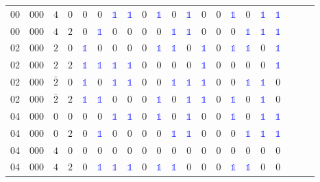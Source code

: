 \begin{longtable*}{c| cccccccccccccccccccc }
00& 000& $4$& $0$& 0& 0& \textcolor{blue}{$\mathds{1}$}& \textcolor{blue}{$\mathds{1}$}& 0& \textcolor{blue}{$\mathds{1}$}& 0& \textcolor{blue}{$\mathds{1}$}& 0& 0& \textcolor{blue}{$\mathds{1}$}& 0& \textcolor{blue}{$\mathds{1}$}& \textcolor{blue}{$\mathds{1}$}\\
00& 000& $4$& $2$& 0& \textcolor{blue}{$\mathds{1}$}& 0& 0& 0& 0& \textcolor{blue}{$\mathds{1}$}& \textcolor{blue}{$\mathds{1}$}& 0& 0& 0& \textcolor{blue}{$\mathds{1}$}& \textcolor{blue}{$\mathds{1}$}& \textcolor{blue}{$\mathds{1}$}\\
02& 000& $2$& $0$& \textcolor{blue}{$\mathds{1}$}& 0& 0& 0& 0& \textcolor{blue}{$\mathds{1}$}& \textcolor{blue}{$\mathds{1}$}& 0& \textcolor{blue}{$\mathds{1}$}& 0& \textcolor{blue}{$\mathds{1}$}& \textcolor{blue}{$\mathds{1}$}& 0& \textcolor{blue}{$\mathds{1}$}\\
02& 000& $2$& $2$& \textcolor{blue}{$\mathds{1}$}& \textcolor{blue}{$\mathds{1}$}& \textcolor{blue}{$\mathds{1}$}& \textcolor{blue}{$\mathds{1}$}& 0& 0& 0& 0& \textcolor{blue}{$\mathds{1}$}& 0& 0& 0& 0& \textcolor{blue}{$\mathds{1}$}\\
02& 000& $\bar{2}$& $0$& \textcolor{blue}{$\mathds{1}$}& 0& \textcolor{blue}{$\mathds{1}$}& \textcolor{blue}{$\mathds{1}$}& 0& 0& \textcolor{blue}{$\mathds{1}$}& \textcolor{blue}{$\mathds{1}$}& \textcolor{blue}{$\mathds{1}$}& 0& 0& \textcolor{blue}{$\mathds{1}$}& \textcolor{blue}{$\mathds{1}$}& 0\\
02& 000& $\bar{2}$& $2$& \textcolor{blue}{$\mathds{1}$}& \textcolor{blue}{$\mathds{1}$}& 0& 0& 0& \textcolor{blue}{$\mathds{1}$}& 0& \textcolor{blue}{$\mathds{1}$}& \textcolor{blue}{$\mathds{1}$}& 0& \textcolor{blue}{$\mathds{1}$}& 0& \textcolor{blue}{$\mathds{1}$}& 0\\
04& 000& $0$& $0$& 0& 0& \textcolor{blue}{$\mathds{1}$}& \textcolor{blue}{$\mathds{1}$}& 0& \textcolor{blue}{$\mathds{1}$}& 0& \textcolor{blue}{$\mathds{1}$}& 0& 0& \textcolor{blue}{$\mathds{1}$}& 0& \textcolor{blue}{$\mathds{1}$}& \textcolor{blue}{$\mathds{1}$}\\
04& 000& $0$& $2$& 0& \textcolor{blue}{$\mathds{1}$}& 0& 0& 0& 0& \textcolor{blue}{$\mathds{1}$}& \textcolor{blue}{$\mathds{1}$}& 0& 0& 0& \textcolor{blue}{$\mathds{1}$}& \textcolor{blue}{$\mathds{1}$}& \textcolor{blue}{$\mathds{1}$}\\
04& 000& $4$& $0$& 0& 0& 0& 0& 0& 0& 0& 0& 0& 0& 0& 0& 0& 0\\
04& 000& $4$& $2$& 0& \textcolor{blue}{$\mathds{1}$}& \textcolor{blue}{$\mathds{1}$}& \textcolor{blue}{$\mathds{1}$}& 0& \textcolor{blue}{$\mathds{1}$}& \textcolor{blue}{$\mathds{1}$}& 0& 0& 0& \textcolor{blue}{$\mathds{1}$}& \textcolor{blue}{$\mathds{1}$}& 0& 0\\

\end{longtable*}
